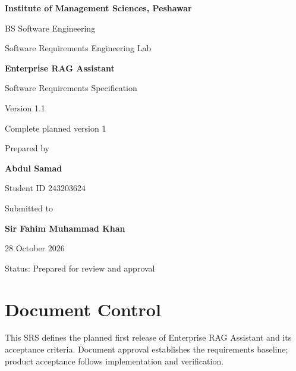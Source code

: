 \documentclass[11pt,letterpaper]{article}
\begin{document}
\begin{titlepage}
\centering
{\bfseries Institute of Management Sciences, Peshawar\par}
\vspace{6pt}
BS Software Engineering\par
Software Requirements Engineering Lab\par
\vspace{1.0cm}
{\LARGE\bfseries Enterprise RAG Assistant\par}
\vspace{9pt}
{\Large Software Requirements Specification\par}
\vspace{9pt}
Version 1.1\par
Complete planned version 1\par
\vspace{1.0cm}
Prepared by\par
{\bfseries Abdul Samad\par}
Student ID 243203624\par
\vspace{9pt}
Submitted to\par
{\bfseries Sir Fahim Muhammad Khan\par}
28 October 2026\par
\vspace{1.0cm}
Status: Prepared for review and approval\par
\end{titlepage}
\setcounter{page}{2}
\section*{Document Control}


This SRS defines the planned first release of Enterprise RAG Assistant and its acceptance criteria. Document approval establishes the requirements baseline; product acceptance follows implementation and verification.\par

\begingroup\small
\end{document}
